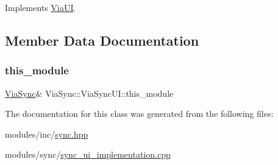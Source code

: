 Implements \mbox{\hyperlink{class_via_u_i_a4bd3d575f4efe1273d6e4645454ead52}{Via\+UI}}.



\subsection{Member Data Documentation}
\mbox{\label{class_via_sync_1_1_via_sync_u_i_a15989db3913bb8fb9abf9961d1125e63}} 
\subsubsection{\texorpdfstring{this\+\_\+module}{this\_module}}
{\footnotesize\ttfamily \mbox{\hyperlink{class_via_sync}{Via\+Sync}}\& Via\+Sync\+::\+Via\+Sync\+U\+I\+::this\+\_\+module}



The documentation for this class was generated from the following files\+:\begin{DoxyCompactItemize}
\item 
modules/inc/\mbox{\hyperlink{sync_8hpp}{sync.\+hpp}}\item 
modules/sync/\mbox{\hyperlink{sync__ui__implementation_8cpp}{sync\+\_\+ui\+\_\+implementation.\+cpp}}\end{DoxyCompactItemize}
